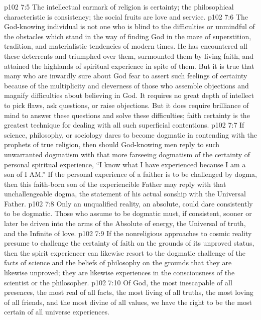 \vs p102 7:5 The intellectual earmark of religion is certainty; the philosophical characteristic is consistency; the social fruits are love and service.
\pc \vs p102 7:6 The God\hyp{}knowing individual is not one who is blind to the difficulties or unmindful of the obstacles which stand in the way of finding God in the maze of superstition, tradition, and materialistic tendencies of modern times. He has encountered all these deterrents and triumphed over them, surmounted them by living faith, and attained the highlands of spiritual experience in spite of them. But it is true that many who are inwardly sure about God fear to assert such feelings of certainty because of the multiplicity and cleverness of those who assemble objections and magnify difficulties about believing in God. It requires no great depth of intellect to pick flaws, ask questions, or raise objections. But it does require brilliance of mind to answer these questions and solve these difficulties; faith certainty is the greatest technique for dealing with all such superficial contentions.
\pc \vs p102 7:7 If science, philosophy, or sociology dares to become dogmatic in contending with the prophets of true religion, then should God\hyp{}knowing men reply to such unwarranted dogmatism with that more farseeing dogmatism of the certainty of personal spiritual experience, “I know what I have experienced because I am a son of I AM.” If the personal experience of a faither is to be challenged by dogma, then this faith\hyp{}born son of the experiencible Father may reply with that unchallengeable dogma, the statement of his actual sonship with the Universal Father.
\vs p102 7:8 Only an unqualified reality, an absolute, could dare consistently to be dogmatic. Those who assume to be dogmatic must, if consistent, sooner or later be driven into the arms of the Absolute of energy, the Universal of truth, and the Infinite of love.
\vs p102 7:9 If the nonreligious approaches to cosmic reality presume to challenge the certainty of faith on the grounds of its unproved status, then the spirit experiencer can likewise resort to the dogmatic challenge of the facts of science and the beliefs of philosophy on the grounds that they are likewise unproved; they are likewise experiences in the consciousness of the scientist or the philosopher.
\pc \vs p102 7:10 Of God, the most inescapable of all presences, the most real of all facts, the most living of all truths, the most loving of all friends, and the most divine of all values, we have the right to be the most certain of all universe experiences.
